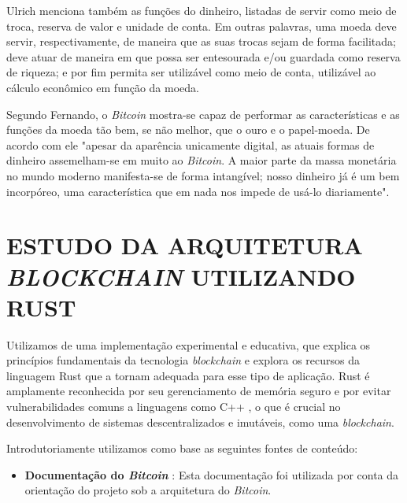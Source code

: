 \documentclass[article,12pt,oneside,a4paper,english,brazil]{unifil}
\begin{document}
\begin{Spacing}{1.5}
\begin{table}[h]
\begin{tabular}{|c|c|c|c|}
	\end{tabular}
    \label{tab:atributos}
\end{table}
\FloatBarrier

Ulrich menciona também as funções do dinheiro, listadas de servir como meio de troca, reserva de valor e unidade de conta. Em outras palavras, uma moeda deve servir, respectivamente, de maneira que as suas trocas sejam de forma facilitada; deve atuar de maneira em que possa ser entesourada e/ou guardada como reserva de riqueza; e por fim permita ser utilizável como meio de conta, utilizável ao cálculo econômico em função da moeda.

Segundo Fernando, o \textit{Bitcoin} mostra-se capaz de performar as características e as funções da moeda tão bem, se não melhor, que o ouro e o papel-moeda. De acordo com ele "apesar da aparência unicamente digital, as atuais formas de dinheiro assemelham-se em muito ao \textit{Bitcoin}. A maior parte da massa monetária no mundo moderno manifesta-se de forma intangível; nosso dinheiro já é um bem incorpóreo, uma característica que em nada nos impede de usá-lo diariamente"\cite[p.95]{Ulrich2014}.



% 

\section*{ESTUDO DA ARQUITETURA \textit{BLOCKCHAIN} UTILIZANDO RUST}

Utilizamos de uma implementação experimental e educativa, que explica os princípios fundamentais da tecnologia \textit{blockchain} e explora os recursos da linguagem Rust que a tornam adequada para esse tipo de aplicação. Rust é amplamente reconhecida por seu gerenciamento de memória seguro e por evitar vulnerabilidades comuns a linguagens como C++ \cite{matsakis2014rust}, o que é crucial no desenvolvimento de sistemas descentralizados e imutáveis, como uma \textit{blockchain}.

Introdutoriamente utilizamos como base as seguintes fontes de conteúdo:
\begin{itemize}
    \item \textbf{Documentação do \textit{Bitcoin}} \cite{nakamoto2008bitcoin}: Esta documentação foi utilizada por conta da orientação do projeto sob a arquitetura do \textit{Bitcoin}.


\end{itemize}
\end{Spacing}
\end{document}
